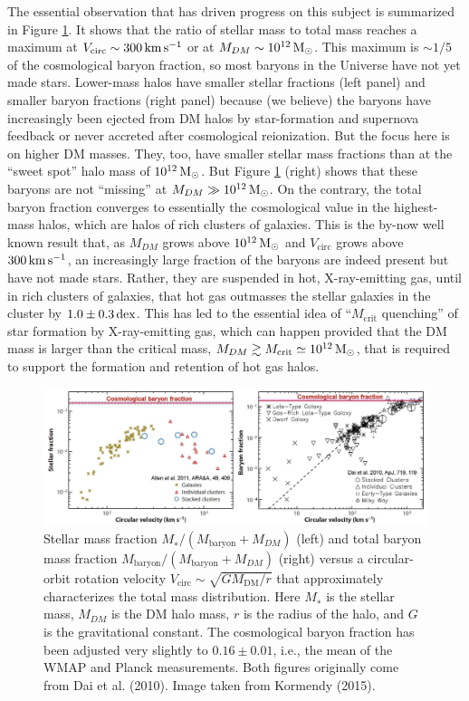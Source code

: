 \documentclass[a4paper,10pt]{article}
\begin{document}
{\noindent}The essential observation that has driven progress on this subject is summarized in Figure \ref{fig:sfquenching}. It shows that the ratio of stellar mass to total mass reaches a maximum at $V_\mathrm{circ}\sim300\,{\rm km\,s^{-1}}$ or at $M_{DM}\sim10^{12}\,{\rm M_\odot}$. This maximum is $\sim1/5$ of the cosmological baryon fraction, so most baryons in the Universe have not yet made stars. Lower-mass halos have smaller stellar fractions (left panel) and smaller baryon fractions (right panel) because (we believe) the baryons have increasingly been ejected from DM halos by star-formation and supernova feedback or never accreted after cosmological reionization. But the focus here is on higher DM masses. They, too, have smaller stellar mass fractions than at the ``sweet spot'' halo mass of $10^{12}\,{\rm M_\odot}$. But Figure \ref{fig:sfquenching} (right) shows that these baryons are not ``missing'' at $M_{DM}\gg10^{12}\,{\rm M_\odot}$. On the contrary, the total baryon fraction converges to essentially the cosmological value in the highest-mass halos, which are halos of rich clusters of galaxies. This is the by-now well known result that, as $M_{DM}$ grows above $10^{12}\,{\rm M_\odot}$ and $V_\mathrm{circ}$ grows above $300\,{\rm km\,s^{-1}}$, an increasingly large fraction of the baryons are indeed present but have not made stars. Rather, they are suspended in hot, X-ray-emitting gas, until in rich clusters of galaxies, that hot gas outmasses the stellar galaxies in the cluster by $1.0\pm0.3\,{\rm dex}$. This has led to the essential idea of ``$M_\mathrm{crit}$ quenching'' of star formation by X-ray-emitting gas, which can happen provided that the DM mass is larger than the critical mass, $M_{DM}\gtrsim M_\mathrm{crit}\simeq10^{12}\,{\rm M_\odot}$, that is required to support the formation and retention of hot gas halos.

\begin{figure}[h]
    \centering
    \includegraphics[width=16cm]{figures/SFquenching.png}
    \caption{\footnotesize{Stellar mass fraction $M_∗/(M_\mathrm{baryon}+M_{DM})$ (left) and total baryon mass fraction $M_\mathrm{baryon}/(M_\mathrm{baryon}+M_{DM})$ (right) versus a circular-orbit rotation velocity $V_\mathrm{circ}\sim \sqrt{GM_\mathrm{DM}/r}$ that approximately characterizes the total mass distribution. Here $M_∗$ is the stellar mass, $M_{DM}$ is the DM halo mass, $r$ is the radius of the halo, and $G$ is the gravitational constant. The cosmological baryon fraction has been adjusted very slightly to $0.16\pm0.01$, i.e., the mean of the WMAP and Planck measurements. Both figures originally come from Dai et al. (2010). Image taken from Kormendy (2015).}}
    \label{fig:sfquenching}
\end{figure}
\end{document}
